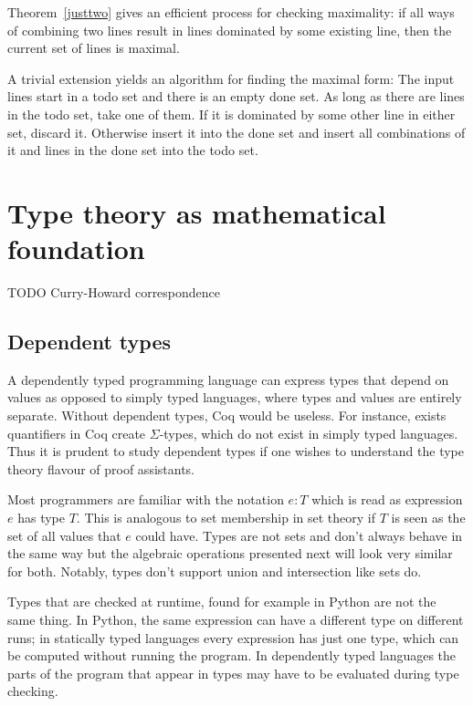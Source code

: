 \documentclass[english, 12pt, a4paper, sci, a-1b, online]{aaltothesis}
\begin{document}
Theorem~\ref{justtwo} gives an efficient process for checking maximality: if all ways of combining two lines result in lines dominated by some existing line, then the current set of lines is maximal.

A trivial extension yields an algorithm for finding the maximal form: The input lines start in a todo set and there is an empty done set. As long as there are lines in the todo set, take one of them. If it is dominated by some other line in either set, discard it. Otherwise insert it into the done set and insert all combinations of it and lines in the done set into the todo set.


\section{Type theory as mathematical foundation}\label{dependent}

TODO Curry-Howard correspondence

\subsection{Dependent types}

A dependently typed programming language can express types that depend on values as opposed to simply typed languages, where types and values are entirely separate. Without dependent types, Coq would be useless. For instance, exists quantifiers in Coq create $\Sigma$-types, which do not exist in simply typed languages. Thus it is prudent to study dependent types if one wishes to understand the type theory flavour of proof assistants.

Most programmers are familiar with the notation $e : T$ which is read as expression $e$ has type $T$. This is analogous to set membership in set theory if $T$ is seen as the set of all values that $e$ could have. Types are not sets and don't always behave in the same way but the algebraic operations presented next will look very similar for both. Notably, types don't support union and intersection like sets do.

Types that are checked at runtime, found for example in Python are not the same thing. In Python, the same expression can have a different type on different runs; in statically typed languages every expression has just one type, which can be computed without running the program. In dependently typed languages the parts of the program that appear in types may have to be evaluated during type checking.
\end{document}
